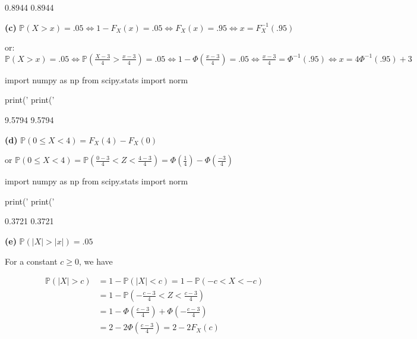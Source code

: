 \begin{console}
0.8944
0.8944
\end{console}

\textbf{(c)} \(\mathbb{P}(X > x) = .05
\Longleftrightarrow 1 - F_X(x) = .05
\Longleftrightarrow F_X(x) = .95
\Longleftrightarrow x = F_X^{-1}(.95)\)

or: \(\mathbb{P}(X > x) = .05
\Longleftrightarrow \mathbb{P}\left(\frac{X - 3}{4} > \frac{x - 3}{4}\right) = .05
\Longleftrightarrow 1 - \Phi\left(\frac{x - 3}{4}\right) = .05
\Longleftrightarrow \frac{x - 3}{4} = \Phi^{-1}(.95)
\Longleftrightarrow x = 4 \Phi^{-1}(.95) + 3\)

\begin{python}
import numpy as np
from scipy.stats import norm

print('%
print('%
\end{python}

\begin{console}
9.5794
9.5794
\end{console}

\textbf{(d)} \(\mathbb{P}(0 \leq X < 4) = F_X(4) - F_X(0)\)

or
\(\mathbb{P}(0 \leq X < 4) = \mathbb{P}\left(\frac{0 - 3}{4} < Z < \frac{4 - 3}{4} \right) = \Phi\left( \frac{1}{4} \right) - \Phi\left( \frac{-3}{4} \right)\)

\begin{python}
import numpy as np
from scipy.stats import norm

print('%
print('%
\end{python}

\begin{console}
0.3721
0.3721
\end{console}

\textbf{(e)} \(\mathbb{P}(|X| > |x|) = .05\)

For a constant \(c \geq 0\), we have

\begin{align*}
\mathbb{P}(|X| > c) &= 1 - \mathbb{P}(|X| < c) = 1 - \mathbb{P}(-c < X < -c) \\
&= 1 - \mathbb{P}\left( -\frac{c - 3}{4} < Z < \frac{c - 3}{4} \right)\\
&= 1 - \Phi\left( \frac{c - 3}{4} \right) + \Phi\left( -\frac{c - 3}{4} \right) \\
&= 2 - 2 \Phi\left( \frac{c - 3}{4} \right) = 2 - 2 F_X(c)
\end{align*}

